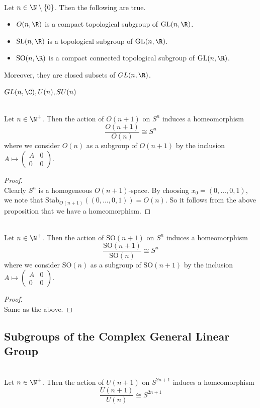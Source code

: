 \documentclass[a4paper]{article}
\begin{document}
\begin{prp}{}{}\\
Let $n\in\N\setminus\{0\}$. Then the following are true. 
\begin{itemize}
\item $O(n,\R)$ is a compact topological subgroup of $\text{GL}(n,\R)$. 
\item $\text{SL}(n,\R)$ is a topological subgroup of $\text{GL}(n,\R)$. 
\item $\text{SO}(n,\R)$ is a compact connected topological subgroup of $\text{GL}(n,\R)$. 
\end{itemize}
Moreover, they are closed subsets of $GL(n,\R)$. 
\end{prp}

$GL(n,\C), U(n), SU(n)$

\begin{prp}{}{}\\
Let $n\in\N^+$. Then the action of $O(n+1)$ on $S^n$ induces a homeomorphism $$\frac{O(n+1)}{O(n)}\cong S^n$$ where we consider $O(n)$ as a subgroup of $O(n+1)$ by the inclusion $A\mapsto\begin{pmatrix}
A & 0\\
0 & 0
\end{pmatrix}$. 
\begin{proof}\\
Clearly $S^n$ is a homogeneous $O(n+1)$-space. By choosing $x_0=(0,\dots,0,1)$, we note that $\text{Stab}_{O(n+1)}((0,\dots,0,1))=O(n)$. So it follows from the above proposition that we have a homeomorphism. 
\end{proof}
\end{prp}

\begin{prp}{}{}\\
Let $n\in\N^+$. Then the action of $\text{SO}(n+1)$ on $S^n$ induces a homeomorphism $$\frac{\text{SO}(n+1)}{\text{SO}(n)}\cong S^n$$ where we consider $\text{SO}(n)$ as a subgroup of $\text{SO}(n+1)$ by the inclusion $A\mapsto\begin{pmatrix}
A & 0\\
0 & 0
\end{pmatrix}$. 
\begin{proof}\\
Same as the above. 
\end{proof}
\end{prp}

\subsection{Subgroups of the Complex General Linear Group}
\begin{eg}{}{}\\
Let $n\in\N^+$. Then the action of $U(n+1)$ on $S^{2n+1}$ induces a homeomorphism $$\frac{U(n+1)}{U(n)}\cong S^{2n+1}$$
\end{eg}
\end{document}
